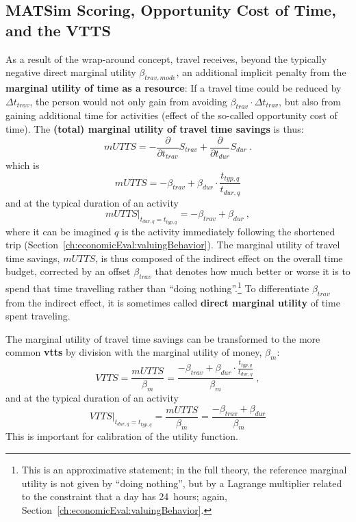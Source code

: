 \subsection{MATSim Scoring, Opportunity Cost of Time, and the VTTS}
\label{sec:opport-cost-of-time}
As a result of the wrap-around concept, travel receives, beyond the typically negative direct marginal utility $\beta_{trav, mode}$, an additional implicit penalty from the \textbf{marginal utility of time as a resource}:
If a travel time could be reduced by 
$\Delta t_{trav}$, the person would not only gain from avoiding $\beta_{trav} \cdot \Delta t_{trav}$, but also from gaining additional time for activities (effect of the so-called opportunity cost of time). The \textbf{(total) marginal utility of travel time savings} is thus:
%
\[
mUTTS = - \frac{\partial}{\partial t_{trav}} S_{trav} + \frac{\partial}{\partial t_{dur}}S_{dur} \ .
\]
which is
\begin{equation}
mUTTS = - \beta_{trav}
+  \beta_{dur} \cdot \frac{t_{typ,q}}{t_{dur,q}} 
\label{eq:mUTTSfull}
\end{equation}
and at the typical duration of an activity
\[
mUTTS \Big|_{t_{dur,q} = t_{typ,q}} = - \beta_{trav} + \beta_{dur} \ , 
\]
where it can be imagined $q$ is the activity immediately following the shortened trip (\cf Section~\ref{ch:economicEval:valuingBehavior}).
%
The marginal utility of travel time savings, $mUTTS$, is thus composed of the indirect effect on the overall time budget, corrected by an offset $\beta_{trav}$ that denotes how much better or worse it is to spend that time travelling rather than ``doing nothing''.\footnote{%
  This is an approximative statement; in the full theory, the reference marginal utility is not given by ``doing nothing'', but by a Lagrange multiplier related to the constraint that a day has 24~hours; again, \cf Section~\ref{ch:economicEval:valuingBehavior}.
} To differentiate $\beta_{trav}$ from the indirect effect, it is sometimes called \textbf{direct marginal utility} of time spent traveling.


The marginal utility of travel time savings
can be transformed to the more common \textbf{\acrfull{vtts}} by division with the marginal utility of money, $\beta_{m}$:
\[
VTTS = \frac{mUTTS}{\beta_{m}} = \frac{- \beta_{trav} + \beta_{dur} \cdot \frac{t_{typ,q}}{t_{dur,q}} }{\beta_{m}} \ ,
\]
and at the typical duration of an activity
\[
VTTS \Big|_{t_{dur,q} = t_{typ,q}} = \frac{mUTTS}{\beta_{m}} = \frac{- \beta_{trav} + \beta_{dur}}{\beta_{m}}
\]
This is important for calibration of the utility function.

